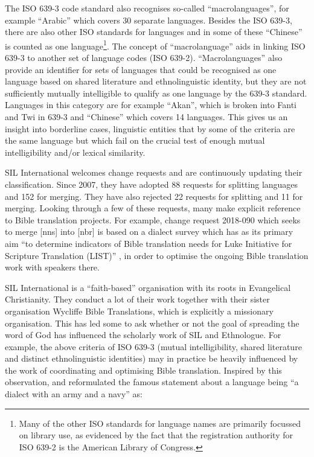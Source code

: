\documentclass[12pt,letterpaper]{article}
\begin{document}
The ISO 639-3 code standard also recognises so-called ``macrolanguages'', for example ``Arabic'' which covers 30 separate languages. Besides the ISO 639-3, there are also other ISO standards for languages and in some of these ``Chinese'' is counted as one language\footnote{Many of the other ISO standards for language names are primarily focussed on library use, as evidenced by the fact that the registration authority for ISO 639-2 is the American Library of Congress.}. The concept of ``macrolanguage'' aids in linking ISO 639-3 to another set of language codes (ISO 639-2). ``Macrolanguages'' also provide an identifier for sets of languages that could be recognised as one language based on shared literature and ethnolinguistic identity, but they are not sufficiently mutually intelligible to qualify as one language by the 639-3 standard. Languages in this category are for example ``Akan'', which is broken into Fanti and Twi in 639-3 and ``Chinese'' which covers 14 languages. This gives us an insight into borderline cases, linguistic entities that by some of the criteria are the same language but which fail on the crucial test of enough mutual intelligibility and/or lexical similarity. 

SIL International welcomes change requests and are continuously updating their classification. Since 2007, they have adopted 88 requests for splitting languages and 152 for merging. They have also rejected 22 requests for splitting and 11 for merging. Looking through a few of these requests, many make explicit reference to Bible translation projects. For example, change request 2018-090 which seeks to merge [nns] into [nbr] is based on a dialect survey which has as its primary aim ``to determine indicators of Bible translation needs for Luke Initiative for Scripture Translation (LIST)'' \citep{change_request_SIL_example}, in order to optimise the ongoing Bible translation work with speakers there.

SIL International is a ``faith-based'' organisation with its roots in Evangelical Christianity. They conduct a lot of their work together with their sister organisation Wycliffe Bible Translations, which is explicitly a missionary organisation. This has led some to ask whether or not the goal of spreading the word of God has influenced the scholarly work of SIL and Ethnologue. For example, the above criteria of ISO 639-3 (mutual intelligibility, shared literature and distinct ethnolinguistic identities) may in practice be heavily influenced by the work of coordinating and optimising Bible translation. Inspired by this observation, \citet{lupkestorch2013} and \citet{blommaert2008artefactual} reformulated the famous statement about a language being ``a dialect with an army and a navy'' as: 
\end{document}
